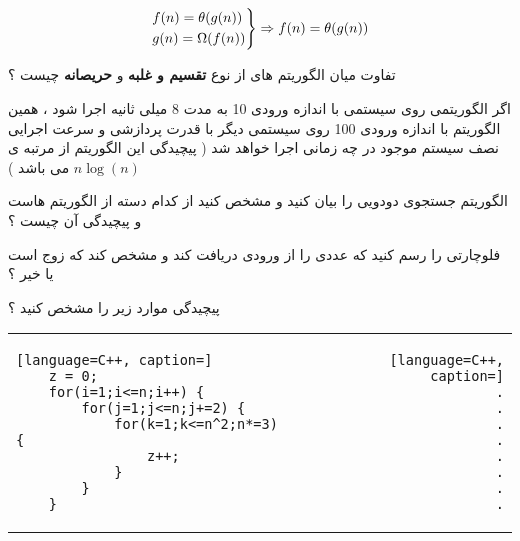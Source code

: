 \documentclass[12pt]{article}
\begin{document}
\begin{align*}
\begin{rcases}
f(n) = \theta(g(n)) \\
g(n) = \Omega(f(n))
\end{rcases} \Rightarrow
f(n) = \theta(g(n))
\end{align*}



\newpage



\noindent
تفاوت میان الگوریتم های از نوع 
\textbf{تقسیم و غلبه}
 و
\textbf{حریصانه}
 چیست ؟


\vspace{30pt}





\noindent
اگر الگوریتمی روی سیستمی با اندازه ورودی 10 به مدت 8 میلی ثانیه اجرا شود ، همین الگوریتم با اندازه ورودی 100 روی سیستمی دیگر با قدرت پردازشی و سرعت اجرایی نصف سیستم موجود در چه زمانی اجرا خواهد شد ( پیچیدگی این الگوریتم از مرتبه ی 
$n\log{(n)}$
می باشد )


\vspace{30pt}



\noindent
الگوریتم جستجوی دودویی را بیان کنید و مشخص کنید از کدام دسته از الگوریتم هاست و پیچیدگی آن چیست ؟


\vspace{30pt}



\noindent
فلوچارتی را رسم کنید که عددی را از ورودی دریافت کند و مشخص کند که زوج است یا خیر ؟




\vspace{30pt}



\noindent
پیچیدگی موارد زیر را مشخص کنید ؟



\begin{latin}
\begin{center}
  \bgroup
  \def\arraystretch{1.5}%
  \begin{tabular}{ E  D  }
	\begin{lstlisting}[language=C++, caption=]
	z = 0;
	for(i=1;i<=n;i++) {
		for(j=1;j<=n;j+=2) {
			for(k=1;k<=n^2;n*=3) {
				z++;
			}
		}
	}
	\end{lstlisting}
     &  
	\begin{lstlisting}[language=C++, caption=]
	.
	.
	.
	.
	.
	.
	.
	.
	\end{lstlisting}
  \end{tabular}
  \egroup
\end{center}
\end{latin}
\end{document}
